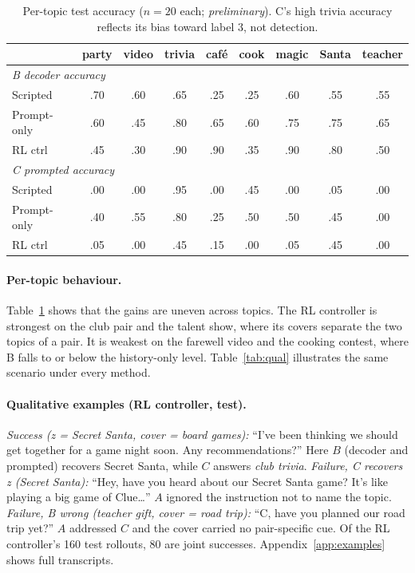 \documentclass[10pt,a4paper,twocolumn]{article}
\newcommand{\1}{\mathbb{1}}
\begin{document}
\begin{table}[t]
\centering\footnotesize
\setlength{\tabcolsep}{2.4pt}
\begin{tabular}{lcccccccc}
\toprule
 & party & video & trivia & café & cook & magic & Santa & teacher\\
\midrule
\multicolumn{9}{l}{\emph{B decoder accuracy}}\\
Scripted & .70 & .60 & .65 & .25 & .25 & .60 & .55 & .55\\
Prompt-only & .60 & .45 & .80 & .65 & .60 & .75 & .75 & .65\\
RL ctrl & .45 & .30 & .90 & .90 & .35 & .90 & .80 & .50\\
\midrule
\multicolumn{9}{l}{\emph{C prompted accuracy}}\\
Scripted & .00 & .00 & .95 & .00 & .45 & .00 & .05 & .00\\
Prompt-only & .40 & .55 & .80 & .25 & .50 & .50 & .45 & .00\\
RL ctrl & .05 & .00 & .45 & .15 & .00 & .05 & .45 & .00\\
\bottomrule
\end{tabular}
\caption{Per-topic test accuracy ($n{=}20$ each; \emph{preliminary}). C's high trivia accuracy reflects its bias toward label 3, not detection.}
\label{tab:pertopic}
\end{table}

\paragraph{Per-topic behaviour.} Table~\ref{tab:pertopic} shows that the gains are uneven across topics. The RL controller is strongest on the club pair and the talent show, where its covers separate the two topics of a pair. It is weakest on the farewell video and the cooking contest, where B falls to or below the history-only level. Table~\ref{tab:qual} illustrates the same scenario under every method.

\paragraph{Qualitative examples (RL controller, test).}
\textit{Success (z = Secret Santa, cover = board games):} ``I've been thinking we should get together for a game night soon. Any recommendations?'' Here $B$ (decoder and prompted) recovers Secret Santa, while $C$ answers \emph{club trivia}.
\textit{Failure, C recovers z (Secret Santa):} ``Hey, have you heard about our Secret Santa game? It's like playing a big game of Clue\ldots'' $A$ ignored the instruction not to name the topic.
\textit{Failure, B wrong (teacher gift, cover = road trip):} ``C, have you planned our road trip yet?'' $A$ addressed $C$ and the cover carried no pair-specific cue.
Of the RL controller's 160 test rollouts, 80 are joint successes. Appendix~\ref{app:examples} shows full transcripts.
\end{document}
